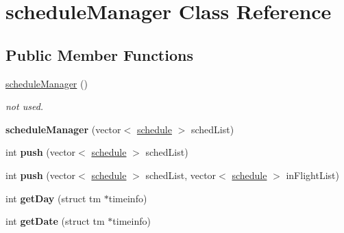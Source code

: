 \hypertarget{classschedule_manager}{
\section{scheduleManager Class Reference}
\label{classschedule_manager}
}
\subsection*{Public Member Functions}
\begin{DoxyCompactItemize}
\item 
\hypertarget{classschedule_manager_afa74bd40f5c2f1e06d27fc0e1f2e6abd}{
\hyperlink{classschedule_manager_afa74bd40f5c2f1e06d27fc0e1f2e6abd}{scheduleManager} ()}
\label{classschedule_manager_afa74bd40f5c2f1e06d27fc0e1f2e6abd}

\begin{DoxyCompactList}\small\item\em not used. \item\end{DoxyCompactList}\item 
\hypertarget{classschedule_manager_a98da966174d3dea49f6555df6199ff68}{
{\bfseries scheduleManager} (vector$<$ \hyperlink{classschedule}{schedule} $>$ schedList)}
\label{classschedule_manager_a98da966174d3dea49f6555df6199ff68}

\item 
\hypertarget{classschedule_manager_aabdd03416794dff46ee01c8e53799fe5}{
int {\bfseries push} (vector$<$ \hyperlink{classschedule}{schedule} $>$ schedList)}
\label{classschedule_manager_aabdd03416794dff46ee01c8e53799fe5}

\item 
\hypertarget{classschedule_manager_a90d08316142c571757bcb3ec898bcff4}{
int {\bfseries push} (vector$<$ \hyperlink{classschedule}{schedule} $>$ schedList, vector$<$ \hyperlink{classschedule}{schedule} $>$ inFlightList)}
\label{classschedule_manager_a90d08316142c571757bcb3ec898bcff4}

\item 
\hypertarget{classschedule_manager_a3966fa1465cc27bd75d74558a8d43e51}{
int {\bfseries getDay} (struct tm $\ast$timeinfo)}
\label{classschedule_manager_a3966fa1465cc27bd75d74558a8d43e51}

\item 
\hypertarget{classschedule_manager_ac4cc6f44c35ce6632b38030bc8c5f60b}{
int {\bfseries getDate} (struct tm $\ast$timeinfo)}
\label{classschedule_manager_ac4cc6f44c35ce6632b38030bc8c5f60b}


\end{DoxyCompactItemize}
